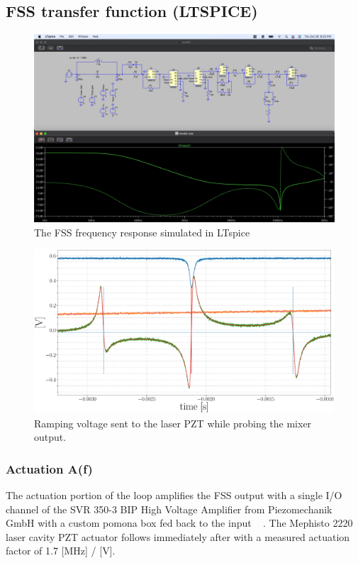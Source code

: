 \begin{landscape}
    \section{FSS transfer function (LTSPICE)}\label{fig:fss_tf}
\begin{figure}[H]
  \begin{center}
    \includegraphics[width=1.33\textwidth]{figs/ALGAAS/tfs/spice_FSS_tf.pdf}
    \caption{The FSS frequency response simulated in LTspice}
  \end{center}
  \label{fig:spiceFSS}
\end{figure}
\end{landscape}

\begin{figure}[H] \label{fig:laser_sweep}
    \centering
	\includegraphics[width=.87\textwidth]{figs/ALGAAS/pdh_measured.pdf}
	\caption{Ramping voltage sent to the laser PZT while probing the mixer output.}
\label{fig:pdhmeasured}
\end{figure}

\subsubsection{Actuation A(f)}
The actuation portion of the loop amplifies the FSS output with a single I/O channel of the SVR 350-3 BIP High Voltage Amplifier from Piezomechanik GmbH with a custom pomona box fed back to the input ~\cite{sugwglog:412} . The Mephisto 2220 laser cavity PZT actuator follows immediately after with a measured actuation factor of 1.7 [MHz] / [V].

